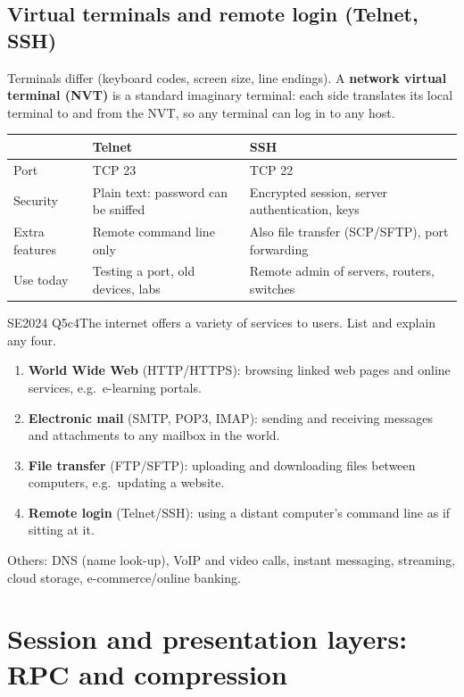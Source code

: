 \documentclass[10pt]{article}
\begin{document}
\subsection{Virtual terminals and remote login (Telnet, SSH)}
Terminals differ (keyboard codes, screen size, line endings). A \textbf{network virtual terminal (NVT)} is a standard imaginary terminal: each side translates its local terminal to and from the NVT, so any terminal can log in to any host.
\begin{center}\small
\begin{tabular}{lll}
\toprule
 & \textbf{Telnet} & \textbf{SSH}\\\midrule
Port & TCP 23 & TCP 22\\
Security & Plain text: password can be sniffed & Encrypted session, server authentication, keys\\
Extra features & Remote command line only & Also file transfer (SCP/SFTP), port forwarding\\
Use today & Testing a port, old devices, labs & Remote admin of servers, routers, switches\\
\bottomrule
\end{tabular}
\end{center}

\begin{pastq}{SE2024 Q5c}{4}The internet offers a variety of services to users. List and explain any four.\end{pastq}
\begin{ans}
\begin{enumerate}
\item \textbf{World Wide Web} (HTTP/HTTPS): browsing linked web pages and online services, e.g.\ e-learning portals.
\item \textbf{Electronic mail} (SMTP, POP3, IMAP): sending and receiving messages and attachments to any mailbox in the world.
\item \textbf{File transfer} (FTP/SFTP): uploading and downloading files between computers, e.g.\ updating a website.
\item \textbf{Remote login} (Telnet/SSH): using a distant computer's command line as if sitting at it.
\end{enumerate}
Others: DNS (name look-up), VoIP and video calls, instant messaging, streaming, cloud storage, e-commerce/online banking.
\end{ans}

\section{Session and presentation layers: RPC and compression}
\end{document}
